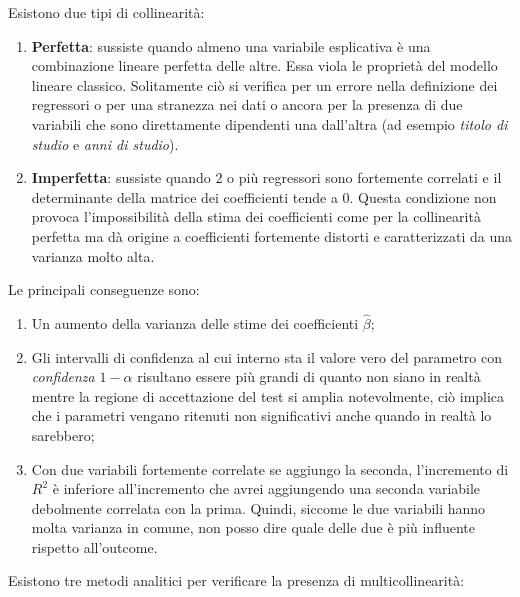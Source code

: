 \documentclass[a4page, 11pt]{article} %
\begin{document}
Esistono due tipi di collinearità:
\begin{enumerate}[noitemsep]
\item \textbf{Perfetta}: sussiste quando almeno una variabile esplicativa è una combinazione lineare perfetta delle altre. Essa viola le proprietà del modello lineare classico. Solitamente ciò si verifica per un errore nella definizione dei regressori o per una stranezza nei dati o ancora per la presenza di due variabili che sono direttamente dipendenti una dall'altra (ad esempio \textit{titolo di studio} e \textit{anni di studio}).
\item \textbf{Imperfetta}: sussiste quando $2$ o più regressori sono fortemente correlati e il determinante della matrice dei coefficienti tende a $0$. Questa condizione non provoca l'impossibilità della stima dei coefficienti come per la collinearità perfetta ma dà origine a coefficienti fortemente distorti e caratterizzati da una varianza molto alta.
\end{enumerate}
Le principali conseguenze sono:
\begin{enumerate}[noitemsep]
\item Un aumento della varianza delle stime dei coefficienti $\hat{\beta}$;
\item Gli intervalli di confidenza al cui interno sta il valore vero del parametro con \textit{confidenza} $1-\alpha$ risultano essere più grandi di quanto non siano in realtà mentre la regione di accettazione del test si amplia notevolmente, ciò implica che i parametri vengano ritenuti non significativi anche quando in realtà lo sarebbero;
\item Con due variabili fortemente correlate se aggiungo la seconda, l’incremento di $R^{2}$ è inferiore all’incremento che avrei aggiungendo una seconda variabile debolmente correlata con la prima. Quindi, siccome le due variabili hanno molta varianza in comune, non posso dire quale delle due è più influente rispetto all’outcome.
\end{enumerate}
Esistono tre metodi analitici per verificare la presenza di multicollinearità:
\end{document}
